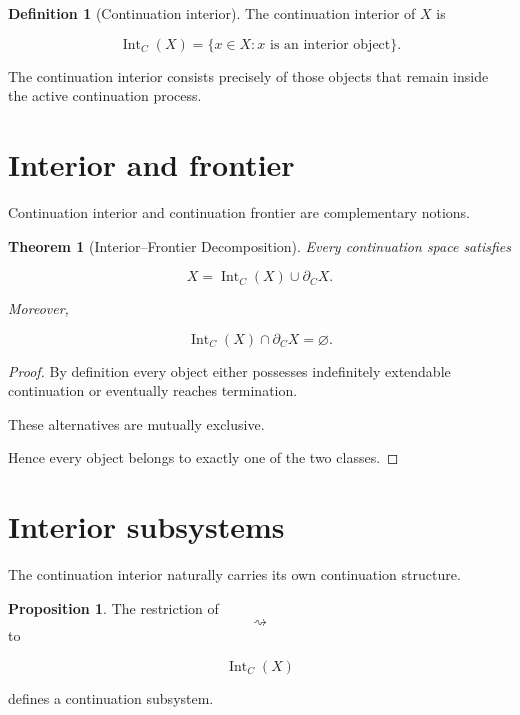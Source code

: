\documentclass[13pt,openany]{book}
\theoremstyle{plain}
\newtheorem{theorem}{Theorem}[chapter]
\theoremstyle{definition}
\newtheorem{definition}{Definition}[chapter]
\newtheorem{proposition}{Proposition}[chapter]
\begin{document}
\begin{definition}[Continuation interior]

The continuation interior of \(X\) is

\[
\operatorname{Int}_C(X)
=
\{
x\in X:
x
\text{ is an interior object}
\}.
\]

\end{definition}

The continuation interior consists precisely of those objects that remain
inside the active continuation process.


\section{Interior and frontier}

Continuation interior and continuation frontier are complementary notions.

\begin{theorem}[Interior--Frontier Decomposition]

Every continuation space satisfies

\[
X
=
\operatorname{Int}_C(X)
\cup
\partial_C X.
\]

Moreover,

\[
\operatorname{Int}_C(X)
\cap
\partial_C X
=
\varnothing.
\]

\end{theorem}

\begin{proof}

By definition every object either possesses indefinitely extendable
continuation or eventually reaches termination.

These alternatives are mutually exclusive.

Hence every object belongs to exactly one of the two classes.

\end{proof}


\section{Interior subsystems}

The continuation interior naturally carries its own continuation structure.

\begin{proposition}

The restriction of
\[
\rightsquigarrow
\]
to

\[
\operatorname{Int}_C(X)
\]

defines a continuation subsystem.

\end{proposition}
\end{document}
